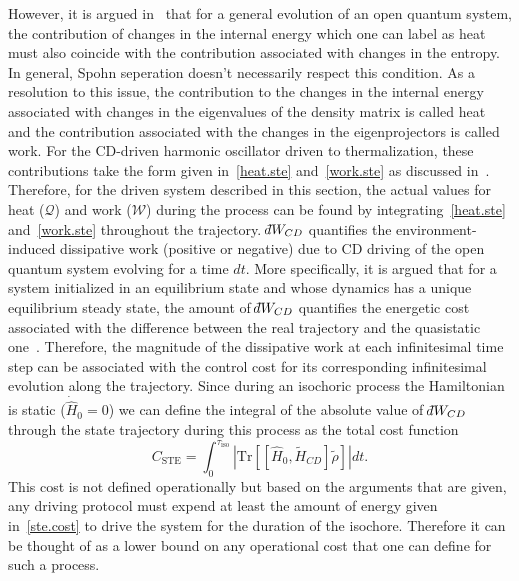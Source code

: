 \documentclass[aps,pra,twocolumn,showpacs,showkeys,groupedaddress,nobalancelastpage,nofootinbib,floatfix,superscriptaddress,longbibliography]{revtex4-2}
\begin{document}
However, it is argued in~\cite{PhysRevA.105.L040201} that for a general evolution of an open quantum system, the contribution of changes in the internal energy which one can label as heat must also coincide with the contribution associated with changes in the entropy. In general, Spohn seperation doesn't necessarily respect this condition. As a resolution to this issue, the contribution to the changes in the internal energy associated with changes in the eigenvalues of the density matrix is called heat and the contribution associated with the changes in the eigenprojectors is called work. For the CD-driven harmonic oscillator driven to thermalization, these contributions take the form given in~\cref{heat.ste} and~\cref{work.ste} as discussed in~\cite{PhysRevA.105.L040201}. Therefore, for the driven system described in this section, the actual values for heat ($\mathcal{Q}$) and work ($\mathcal{W}$) during the process can be found by integrating~\cref{heat.ste} and~\cref{work.ste} throughout the trajectory. $\dbar W_{CD}$ quantifies the environment-induced dissipative work (positive or negative) due to CD driving of the open quantum system evolving for a time $dt$. More specifically, it is argued that for a system initialized in an equilibrium state and whose dynamics has a unique equilibrium steady state, the amount of $\dbar W_{CD}$ quantifies the energetic cost associated with the difference between the real trajectory and the quasistatic one~\cite{PhysRevA.105.L040201}. Therefore, the magnitude of the dissipative work at each infinitesimal time step can be associated with the control cost for its corresponding infinitesimal evolution along the trajectory. Since during an isochoric process the Hamiltonian is static ($\dot{\hat{H}}_0=0$) we can define the integral of the absolute value of $\dbar W_{CD}$ through the state trajectory during this process as the total cost function
\begin{equation}\label{ste.cost}
C_{\text{STE}} = \int_{0}^{\tau_{\text{iso}}} \left|\text{Tr}[[\hat{H}_0,\tilde{H}_{CD}] \tilde{\rho}]\right|dt.
\end{equation}
This cost is not defined operationally but based on the arguments that are given, any driving protocol must expend at least the amount of energy given in~\cref{ste.cost} to drive the system for the duration of the isochore. Therefore it can be thought of as a lower bound on any operational cost that one can define for such a process.
\end{document}
